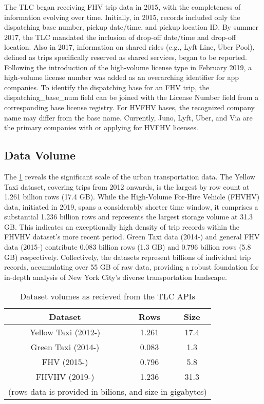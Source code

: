 \documentclass[conference]{IEEEtran}
\begin{document}
The TLC began receiving FHV trip data in 2015, with the completeness of information evolving over time. Initially,
in 2015, records included only the dispatching base number, pickup date/time, and pickup location ID. By summer 2017,
the TLC mandated the inclusion of drop-off date/time and drop-off location. Also in 2017, information on shared rides
(e.g., Lyft Line, Uber Pool), defined as trips specifically reserved as shared services, began to be reported. Following
the introduction of the high-volume license type in February 2019, a high-volume license number was added as an
overarching identifier for app companies.
To identify the dispatching base for an FHV trip, the dispatching\_base\_num field can be joined with the License Number
field from a corresponding base license registry. For HVFHV bases, the recognized company name may differ from the base
name. Currently, Juno, Lyft, Uber, and Via are the primary companies with or applying for HVFHV licenses.

\subsection{Data Volume}
The \ref{tab:raw-volumes} reveals the significant scale of the urban transportation data. The Yellow Taxi dataset,
covering trips from 2012 onwards, is the largest by row count at 1.261 billion rows (17.4 GB). While the High-Volume
For-Hire Vehicle (FHVHV) data, initiated in 2019, spans a considerably shorter time window, it comprises a substantial
1.236 billion rows and represents the largest storage volume at 31.3 GB. This indicates an exceptionally high density
of trip records within the FHVHV dataset's more recent period. Green Taxi data (2014-) and general FHV data (2015-)
contribute 0.083 billion rows (1.3 GB) and 0.796 billion rows (5.8 GB) respectively. Collectively, the datasets
represent billions of individual trip records, accumulating over 55 GB of raw data, providing a robust foundation
for in-depth analysis of New York City's diverse transportation landscape.

\begin{table}[]
  \label{tab:raw-volumes}
  \caption{Dataset volumes as recieved from the TLC APIs }
  \centering
  \begin{tabular}{ccc}
    \textbf{Dataset}& \textbf{Rows}& \textbf{Size}\\
    \hline \hline
    Yellow Taxi (2012-)&1.261& 17.4\\
    Green Taxi (2014-)&0.083& 1.3\\
    FHV (2015-)&0.796& 5.8\\
    FHVHV (2019-)&1.236& 31.3\\
    \hline
    \multicolumn{3}{c}{(rows data is provided in bilions, and size in gigabytes)}
  \end{tabular}
\end{table}
\end{document}
